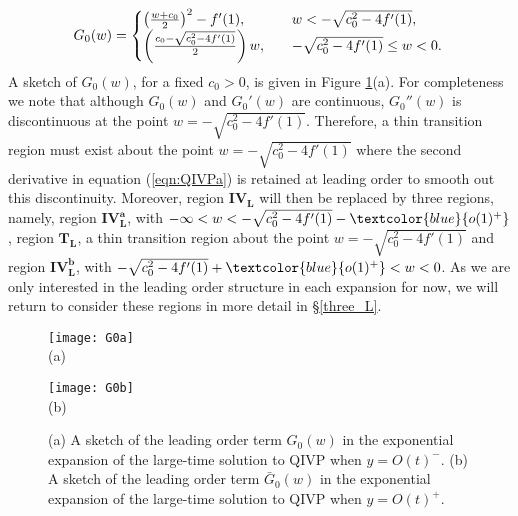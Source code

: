 \documentclass[11pt,a4paper]{article}
\newcommand{\eeref}[1]{(\ref{eqn:#1})}
\newcommand{\eelab}[1]{\label{eqn:#1}}
\newcommand{\ffref}[1]{\ref{fig:#1}}
\newcommand{\fflab}[1]{\label{fig:#1}}
\def\beq{\begin{equation}}
\def\eeq{\end{equation}}
\begin{document}
\beq \eelab{BVP_4l_sol3}
G_0(w) = \begin{cases}  \left( \frac{w+c_0}{2} \right)^2 - f'(1), \quad &  w < - \sqrt{c_0^2 -  4 f'(1)}  ,\\
 \left( \frac{c_0 - \sqrt{c_0^2 -  4 f'(1)}}{2} \right) w , \quad &  -  \sqrt{c_0^2 -  4 f'(1)} \leq  w < 0.  \end{cases} \\
\eeq
A sketch of $G_0(w)$, for a fixed $c_0>0$, is given in Figure \ffref{region_4}(a). For completeness we note that although $G_0(w)$ and $G_0'(w)$ are continuous, $G_0''(w)$ is discontinuous at the point $w= - \sqrt{c_0^2 -  4 f'(1)}$. Therefore, a thin transition region must exist about the point $w= - \sqrt{c_0^2 -  4 f'(1)}$ where the 
second derivative in equation \eeref{QIVPa} is retained at leading order to smooth out this discontinuity. Moreover, region $\mathbf{IV_L}$ will then be replaced by three regions, namely, region $\mathbf{IV_L^a}$, with $ - \infty < w < - \sqrt{c_0^2 -  4 f'(1)} - \textcolor{blue}{o(1)^+}$, region $\mathbf{T_L}$, a thin transition region about the point $w=-  \sqrt{c_0^2 -  4 f'(1)}$ and region $\mathbf{IV_L^b}$, with $-  \sqrt{c_0^2 -  4 f'(1)} +  \textcolor{blue}{o(1)^+} < w < 0$. As we are only interested in the leading order structure in each expansion for now, we will return to consider these regions in more detail  in \S \ref{three_L}.   


   \begin{figure}[t]
     \centering
     \begin{minipage}{0.48\textwidth}
  	     \texttt{[image: G0a]}\\
  	     \centering  (a)
     \end{minipage}
     \hfill
     \begin{minipage}{0.48\textwidth}
  	   \texttt{[image: G0b]}\\
    \centering  (b)
     \end{minipage}
   \caption{
    (a) A sketch of the leading order term $G_0(w)$ in the exponential expansion of the large-time solution to QIVP when $y=O(t)^-$. 
	(b) A sketch of the leading order term $\bar{G}_0(w)$ in the exponential expansion of the large-time solution to QIVP when $y=O(t)^+$.
 \fflab{region_4}
  }
   \end{figure}
   
\end{document}
